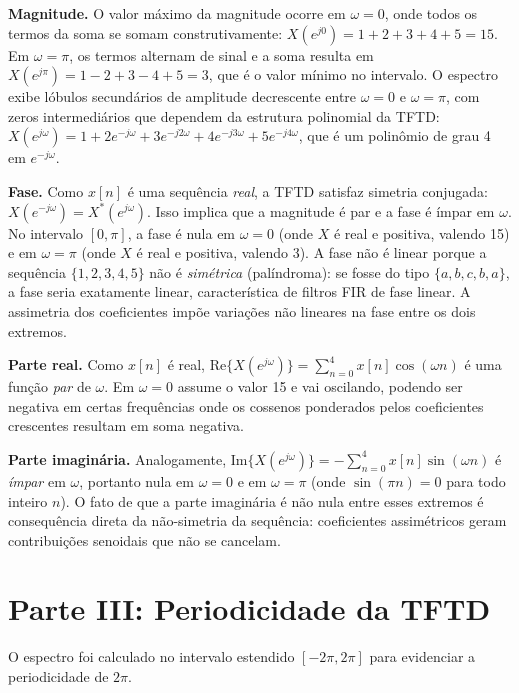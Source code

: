 \documentclass[tcc]{classe_uftex/uftex}
\begin{document}
\textbf{Magnitude.} O valor máximo da magnitude ocorre em $\omega = 0$, onde todos os termos da soma se somam construtivamente: $X(e^{j0}) = 1+2+3+4+5 = 15$. Em $\omega = \pi$, os termos alternam de sinal e a soma resulta em $X(e^{j\pi}) = 1-2+3-4+5 = 3$, que é o valor mínimo no intervalo. O espectro exibe lóbulos secundários de amplitude decrescente entre $\omega = 0$ e $\omega = \pi$, com zeros intermediários que dependem da estrutura polinomial da TFTD: $X(e^{j\omega}) = 1 + 2e^{-j\omega} + 3e^{-j2\omega} + 4e^{-j3\omega} + 5e^{-j4\omega}$, que é um polinômio de grau 4 em $e^{-j\omega}$.

\textbf{Fase.} Como $x[n]$ é uma sequência \emph{real}, a TFTD satisfaz simetria conjugada: $X(e^{-j\omega}) = X^*(e^{j\omega})$. Isso implica que a magnitude é par e a fase é ímpar em $\omega$. No intervalo $[0, \pi]$, a fase é nula em $\omega = 0$ (onde $X$ é real e positiva, valendo 15) e em $\omega = \pi$ (onde $X$ é real e positiva, valendo 3). A fase não é linear porque a sequência $\{1,2,3,4,5\}$ não é \emph{simétrica} (palíndroma): se fosse do tipo $\{a,b,c,b,a\}$, a fase seria exatamente linear, característica de filtros FIR de fase linear. A assimetria dos coeficientes impõe variações não lineares na fase entre os dois extremos.

\textbf{Parte real.} Como $x[n]$ é real, $\text{Re}\{X(e^{j\omega})\} = \sum_{n=0}^{4} x[n]\cos(\omega n)$ é uma função \emph{par} de $\omega$. Em $\omega = 0$ assume o valor 15 e vai oscilando, podendo ser negativa em certas frequências onde os cossenos ponderados pelos coeficientes crescentes resultam em soma negativa.

\textbf{Parte imaginária.} Analogamente, $\text{Im}\{X(e^{j\omega})\} = -\sum_{n=0}^{4} x[n]\sin(\omega n)$ é \emph{ímpar} em $\omega$, portanto nula em $\omega=0$ e em $\omega=\pi$ (onde $\sin(\pi n) = 0$ para todo inteiro $n$). O fato de que a parte imaginária é não nula entre esses extremos é consequência direta da não-simetria da sequência: coeficientes assimétricos geram contribuições senoidais que não se cancelam.

\section{Parte III: Periodicidade da TFTD}

O espectro foi calculado no intervalo estendido $[-2\pi, 2\pi]$ para evidenciar a periodicidade de $2\pi$.
\end{document}
